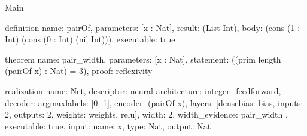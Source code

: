 \begin{lexlean}{Main}
\begin{semanticmodule}
definition{
  name: pairOf,
  parameters: [x : Nat],
  result: (List Int),
  body: (cons (1 : Int) (cons (0 : Int) (nil Int))),
  executable: true
}

theorem{
  name: pair_width,
  parameters: [x : Nat],
  statement: ((prim length (pairOf x) : Nat) = 3),
  proof: reflexivity{}
}

realization{
  name: Net,
  descriptor: neural{
    architecture: integer_feedforward,
    decoder: argmax{labels: [0, 1]},
    encoder: (pairOf x),
    layers: [dense{bias: bias, inputs: 2, outputs: 2, weights: weights}, relu{}],
    width: 2,
    width_evidence: pair_width
  },
  executable: true,
  input: {name: x, type: Nat},
  output: Nat
}
\end{semanticmodule}
\end{lexlean}
